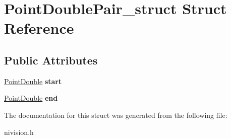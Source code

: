 \hypertarget{structPointDoublePair__struct}{
\section{PointDoublePair\_\-struct Struct Reference}
\label{structPointDoublePair__struct}
}
\subsection*{Public Attributes}
\begin{DoxyCompactItemize}
\item 
\hypertarget{structPointDoublePair__struct_adab857441331f8850cd5b639fa58b567}{
\hyperlink{structPointDouble__struct}{PointDouble} {\bfseries start}}
\label{structPointDoublePair__struct_adab857441331f8850cd5b639fa58b567}

\item 
\hypertarget{structPointDoublePair__struct_a8aa5412ad51aad602889180773c8d0e5}{
\hyperlink{structPointDouble__struct}{PointDouble} {\bfseries end}}
\label{structPointDoublePair__struct_a8aa5412ad51aad602889180773c8d0e5}

\end{DoxyCompactItemize}


The documentation for this struct was generated from the following file:\begin{DoxyCompactItemize}
\item 
nivision.h\end{DoxyCompactItemize}
